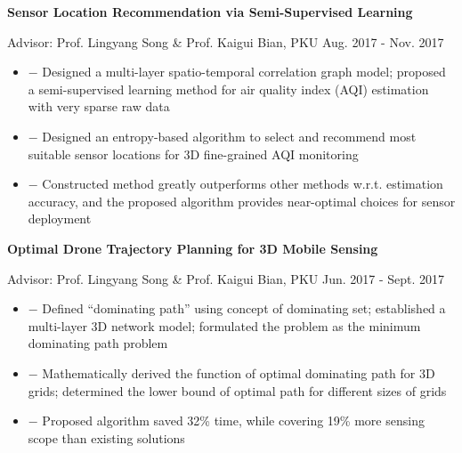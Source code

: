 \documentclass[11pt]{article}
\newenvironment{innerlist}[1][\enskip\textbullet]%
        {\begin{itemize}[#1,leftmargin=*,parsep=0pt,itemsep=0pt,topsep=0pt,partopsep=0pt]}
        {\end{itemize}}
\begin{document}
\vspace{.15in}

\textbf{Sensor Location Recommendation via Semi-Supervised Learning}

\vspace{.02in}
Advisor: Prof. Lingyang Song \& Prof. Kaigui Bian, PKU \hfill {Aug. 2017 - Nov. 2017}

\vspace{.08in}
\begin{innerlist}
\item[$-$] Designed a multi-layer spatio-temporal correlation graph model; proposed a semi-supervised learning method for air quality index (AQI) estimation with very sparse raw data
    \vspace{.03in}
\item[$-$] Designed an entropy-based algorithm to select and recommend most suitable sensor locations for 3D fine-grained AQI monitoring
    \vspace{.03in}
\item[$-$] Constructed method greatly outperforms other methods w.r.t. estimation accuracy, and the proposed algorithm provides near-optimal choices for sensor deployment
\end{innerlist}

\vspace{.15in}

\textbf{Optimal Drone Trajectory Planning for 3D Mobile Sensing}

\vspace{.02in}
Advisor: Prof. Lingyang Song \& Prof. Kaigui Bian, PKU \hfill {Jun. 2017 - Sept. 2017}

\vspace{.08in}
\begin{innerlist}
\item[$-$] Defined ``dominating path'' using concept of dominating set; established a multi-layer 3D network model; formulated the problem as the minimum dominating path problem
    \vspace{.03in}
\item[$-$] Mathematically derived the function of optimal dominating path for 3D grids; determined the lower bound of optimal path for different sizes of grids
    \vspace{.03in}
\item[$-$] Proposed algorithm saved 32\% time, while covering 19\% more sensing scope than existing solutions
\end{innerlist}
\end{document}
